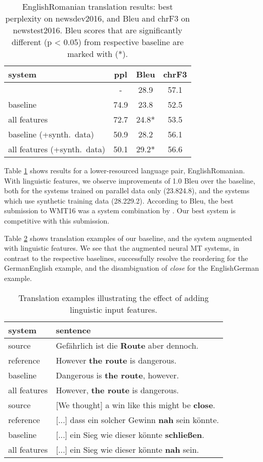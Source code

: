 \documentclass[11pt]{article}
\begin{document}
\begin{table}
\centering
\small
\begin{tabular}{l|c|c|c}
system & ppl  & {\sc Bleu}  & {\sc chrF3} \\
\hline
\cite{qt21syscomb2016} & - & 28.9\phantom{*} & 57.1 \\
\hline
baseline & 74.9 & 23.8\phantom{*} & 52.5 \\ all features & 72.7 & 24.8* & 53.5 \\ \hline
baseline (+synth.\ data) & 50.9 & 28.2\phantom{*} & 56.1 \\ all features (+synth.\ data) & 50.1 & 29.2* & 56.6  \\ \end{tabular}
\caption{EnglishRomanian translation results: best perplexity on newsdev2016, and {\sc Bleu} and {\sc chrF3} on newstest2016. {\sc Bleu} scores that are significantly different (p < 0.05) from respective baseline are marked with (*).}
\label{results-enro}
\end{table}

Table \ref{results-enro} shows results for a lower-resourced language pair, EnglishRomanian.
With linguistic features, we observe improvements of 1.0 {\sc Bleu} over the baseline, both for the systems trained on parallel data only (23.824.8),
and the systems which use synthetic training data (28.229.2).
According to {\sc Bleu}, the best submission to WMT16 was a system combination by .
Our best system is competitive with this submission.

Table \ref{examples} shows translation examples of our baseline, and the system augmented with linguistic features.
We see that the augmented neural MT systems, in contrast to the respective baselines, successfully resolve the reordering for the GermanEnglish example,
and the disambiguation of \emph{close} for the EnglishGerman example.

\begin{table}
\centering
\small
\setlength\tabcolsep{3pt}
\begin{tabular}{l|l}
system & sentence\\
\hline
source & Gefährlich ist die \textbf{Route} aber dennoch. \\ reference & However \textbf{the route} is dangerous.\\
baseline & Dangerous is \textbf{the route}, however.\\
all features & However, \textbf{the route} is dangerous.\\
\hline
\hline
source & [We thought] a win like this might be \textbf{close}.\\ reference & [...] dass ein solcher Gewinn \textbf{nah} sein könnte.\\
baseline & [...] ein Sieg wie dieser könnte \textbf{schließen}.\\
all features & [...] ein Sieg wie dieser könnte \textbf{nah} sein. \\
\hline
\end{tabular}
\caption{Translation examples illustrating the effect of adding linguistic input features.}
\label{examples}
\end{table}
\end{document}
